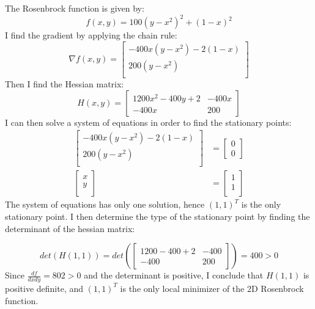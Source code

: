 \documentclass[a4paper]{article}
\begin{document}
\section{}
\label{t3}
The Rosenbrock function is given by:
$$
f(x,y) = 100(y - x^2)^2 + (1 - x)^2
$$
I find the gradient by applying the chain rule:
\[
\nabla f(x,y) = 
\begin{bmatrix}
    -400x(y - x^2) - 2(1-x) \\
    200(y - x^2)            \\
\end{bmatrix}
\]
Then I find the Hessian matrix:
\[
H(x,y) = 
\begin{bmatrix}
    1200x^2 - 400y + 2 & -400x     \\
    -400x & 200
\end{bmatrix}
\]
I can then solve a system of equations in order to find the stationary points:
\begin{align*}
\begin{bmatrix}
    -400x(y - x^2) - 2(1-x) \\
    200(y - x^2)            \\
\end{bmatrix}
&=
\begin{bmatrix}
    0 \\
    0    
\end{bmatrix}\\
\begin{bmatrix}
    x \\
    y \\
\end{bmatrix}
&=
\begin{bmatrix}
    1 \\
    1 \\
\end{bmatrix}
\end{align*}
The system of equations has only one solution, hence $(1,1)^T$ is the only
stationary point. I then determine the type of the stationary point by 
finding the determinant of the hessian matrix:

\[
det(H(1,1)) = 
det\left(\begin{bmatrix}
    1200 - 400 + 2 & -400     \\
    -400 & 200
\end{bmatrix}\right)
= 400 > 0
\]
Since $\frac{df}{dxdy} = 802 > 0$ and the determinant is positive, I conclude that
$H(1,1)$ is positive definite, and $(1,1)^T$ is the only local minimizer of the
2D Rosenbrock function.
\end{document}
